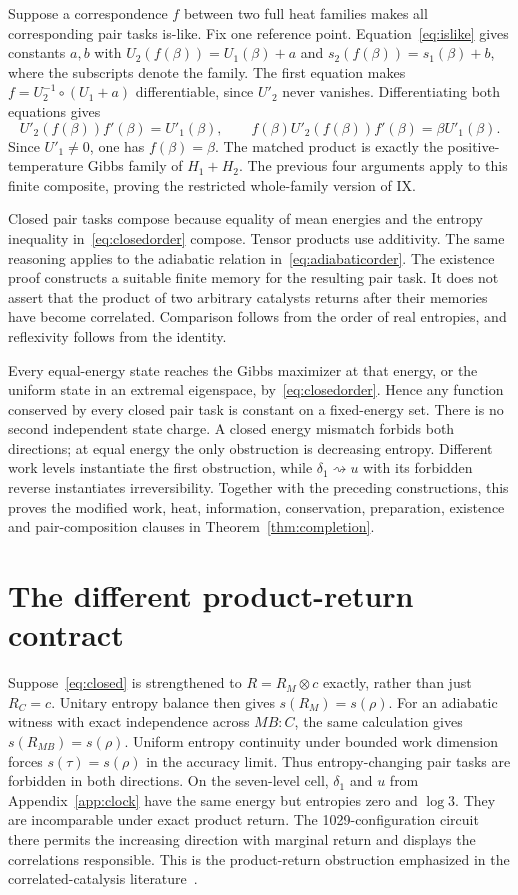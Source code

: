 Suppose a correspondence $f$ between two full heat families makes all corresponding pair tasks is-like. Fix one reference point. Equation~\eqref{eq:islike} gives constants $a,b$ with $U_2(f(\beta))=U_1(\beta)+a$ and $s_2(f(\beta))=s_1(\beta)+b$, where the subscripts denote the family. The first equation makes $f=U_2^{-1}\circ(U_1+a)$ differentiable, since $U'_2$ never vanishes. Differentiating both equations gives
\[
 U'_2(f(\beta))f'(\beta)=U'_1(\beta),\qquad
 f(\beta)U'_2(f(\beta))f'(\beta)=\beta U'_1(\beta).
\]
Since $U'_1\ne0$, one has $f(\beta)=\beta$. The matched product is exactly the positive-temperature Gibbs family of $H_1+H_2$. The previous four arguments apply to this finite composite, proving the restricted whole-family version of IX.

Closed pair tasks compose because equality of mean energies and the entropy inequality in~\eqref{eq:closedorder} compose. Tensor products use additivity. The same reasoning applies to the adiabatic relation in~\eqref{eq:adiabaticorder}. The existence proof constructs a suitable finite memory for the resulting pair task. It does not assert that the product of two arbitrary catalysts returns after their memories have become correlated. Comparison follows from the order of real entropies, and reflexivity follows from the identity.

Every equal-energy state reaches the Gibbs maximizer at that energy, or the uniform state in an extremal eigenspace, by~\eqref{eq:closedorder}. Hence any function conserved by every closed pair task is constant on a fixed-energy set. There is no second independent state charge. A closed energy mismatch forbids both directions; at equal energy the only obstruction is decreasing entropy. Different work levels instantiate the first obstruction, while $\delta_1\rightsquigarrow u$ with its forbidden reverse instantiates irreversibility. Together with the preceding constructions, this proves the modified work, heat, information, conservation, preparation, existence and pair-composition clauses in Theorem~\ref{thm:completion}.

\section{The different product-return contract}\label{app:product}
Suppose~\eqref{eq:closed} is strengthened to $R=R_M\otimes c$ exactly, rather than just $R_C=c$. Unitary entropy balance then gives $s(R_M)=s(\rho)$. For an adiabatic witness with exact independence across $MB:C$, the same calculation gives $s(R_{MB})=s(\rho)$. Uniform entropy continuity under bounded work dimension forces $s(\tau)=s(\rho)$ in the accuracy limit. Thus entropy-changing pair tasks are forbidden in both directions. On the seven-level cell, $\delta_1$ and $u$ from Appendix~\ref{app:clock} have the same energy but entropies zero and $\log3$. They are incomparable under exact product return. The 1029-configuration circuit there permits the increasing direction with marginal return and displays the correlations responsible. This is the product-return obstruction emphasized in the correlated-catalysis literature~\cite{boes,wilming21}.

